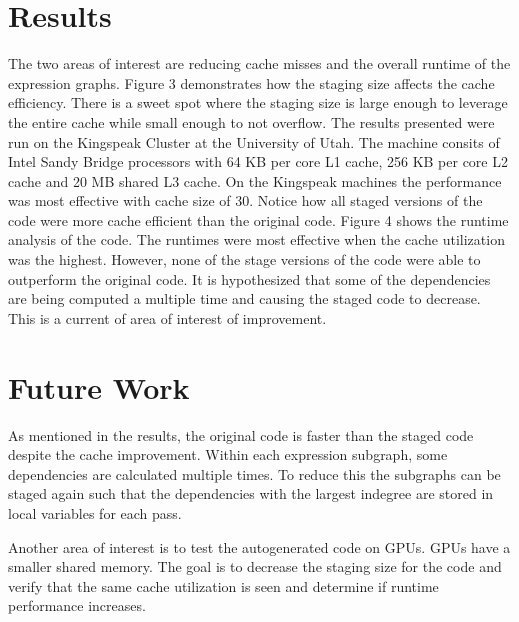 \documentclass[sigconf,]{acmart}
\begin{document}
\section{Results}
The two areas of interest are reducing cache misses and the overall runtime of the expression graphs. Figure 3 demonstrates how the staging size affects the cache efficiency. There is a sweet spot where the staging size is large enough to leverage the entire cache while small enough to not overflow. The results presented were run on the Kingspeak Cluster at the University of Utah. The machine consits of Intel Sandy Bridge processors with 64 KB per core L1 cache, 256 KB per core L2 cache and 20 MB shared L3 cache. On the Kingspeak machines the performance was most effective with cache size of 30. Notice how all staged versions of the code were more cache efficient than the original code. 
Figure 4 shows the runtime analysis of the code. The runtimes were most effective when the cache utilization was the highest. However, none of the stage versions of the code were able to outperform the original code. It is hypothesized that some of the dependencies are being computed a multiple time and causing the staged code to decrease. This is a current of area of interest of improvement.


\section{Future Work}
As mentioned in the results, the original code is faster than the staged code despite the cache improvement. Within each expression subgraph, some dependencies are calculated multiple times. To reduce this the subgraphs can be staged again such that the dependencies with the largest indegree are stored in local variables for each pass.

Another area of interest is to test the autogenerated code on GPUs. GPUs have a smaller shared memory. The goal is to decrease the staging size for the code and verify that the same cache utilization is seen and determine if runtime performance increases.




\end{document}

